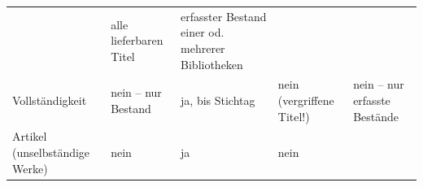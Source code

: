 \documentclass[]{book}
\theoremstyle{definition}
\theoremstyle{definition}
\theoremstyle{definition}
\theoremstyle{remark}
\begin{document}
\begin{longtable}[]{@{}lllll@{}}
\begin{minipage}[t]{0.16\columnwidth}
\end{minipage} & \begin{minipage}[t]{0.14\columnwidth}\raggedright\strut
alle lieferbaren Titel\vspace{5mm}\strut
\end{minipage} & \begin{minipage}[t]{0.18\columnwidth}\raggedright\strut
erfasster Bestand einer od. mehrerer Bibliotheken \vspace{5mm}\strut
\end{minipage}\tabularnewline
\begin{minipage}[t]{0.21\columnwidth}\raggedright\strut
Vollständigkeit \vspace{5mm}\strut
\end{minipage} & \begin{minipage}[t]{0.18\columnwidth}\raggedright\strut
nein -- nur Bestand \vspace{5mm}\strut
\end{minipage} & \begin{minipage}[t]{0.16\columnwidth}\raggedright\strut
ja, bis Stichtag\vspace{5mm}\strut
\end{minipage} & \begin{minipage}[t]{0.14\columnwidth}\raggedright\strut
nein (vergriffene Titel!) \vspace{5mm}\strut
\end{minipage} & \begin{minipage}[t]{0.18\columnwidth}\raggedright\strut
nein -- nur erfasste Bestände \vspace{5mm}\strut
\end{minipage}\tabularnewline
\begin{minipage}[t]{0.21\columnwidth}\raggedright\strut
Artikel (unselbständige Werke) \vspace{5mm}\strut
\end{minipage} & \begin{minipage}[t]{0.18\columnwidth}\raggedright\strut
nein \vspace{5mm}\strut
\end{minipage} & \begin{minipage}[t]{0.16\columnwidth}\raggedright\strut
ja \vspace{5mm}\strut
\end{minipage} & \begin{minipage}[t]{0.14\columnwidth}\raggedright\strut
nein \vspace{5mm}\strut
\end{minipage} & \begin{minipage}[t]{0.18\columnwidth}\raggedright\strut

\end{minipage}
\end{longtable}
\end{document}
